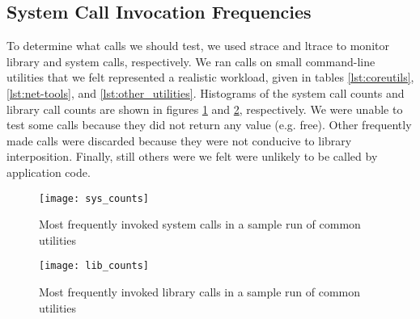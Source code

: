 \subsection{System Call Invocation Frequencies}
To determine what calls we should test, we used strace and ltrace to monitor library and system calls, respectively. We ran calls on small command-line utilities that we felt represented a realistic workload, given in tables \ref{lst:coreutils}, \ref{lst:net-tools}, and \ref{lst:other_utilities}. Histograms of the system call counts and library call counts are shown in figures \ref{fig:sys_counts} and \ref{fig:lib_counts}, respectively. We were unable to test some calls because they did not return any value (e.g. free). Other frequently made calls were discarded because they were not conducive to library interposition. Finally, still others were we felt were unlikely to be called by application code. \\
\begin{figure}
\centering
\texttt{[image: sys\_counts]}
\caption{Most frequently invoked system calls in a sample run of common utilities}
\label{fig:sys_counts}
\end{figure}

\begin{figure}
\centering
\texttt{[image: lib\_counts]}
\caption{Most frequently invoked library calls in a sample run of common utilities}
\label{fig:lib_counts}
\end{figure}
